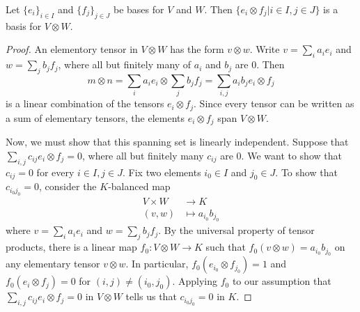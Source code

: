 \begin{prop}
Let $\{ e_i \}_{i \in I}$ and $\{ f_j \}_{j \in J}$ be bases for $V$ and $W$.  Then $\{ e_i \otimes f_j | i \in I, j \in J\}$  is a basis for $V \otimes W$.
\end{prop}
\begin{proof}
An elementory tensor in $V \otimes W$ has the form $v \otimes w$.  Write $v = \sum_i a_i e_i$ and $w = \sum_j b_j f_j$, where all but finitely many of $a_i$ and $b_j$ are 0.  Then 
\[ m \otimes n = \sum_i a_i e_i \otimes \sum_j b_j f_j  = \sum_{i,j} a_i b_j e_i \otimes f_j\]
is a linear combination of the tensors $e_i \otimes f_j$.  Since every tensor can be written as a sum of elementary tensors, the elements $e_i \otimes f_j$ span $V \otimes W$.

Now, we must show that this spanning set is linearly independent.  Suppose that $\sum_{i,j} c_{ij} e_i \otimes f_j = 0$, where all but finitely many $c_{ij}$ are 0.  We want to show that $c_{ij} = 0$ for every $i \in I, j \in J$. Fix two elements $ i_0 \in I$ and $j_0 \in J$.  To show that $c_{i_0 j_0} = 0$, consider the $K$-balanced map
\begin{align*}
V \times W &\to K \\
(v,w) &\mapsto a_{i_0} b_{j_0}
\end{align*}
 where $v = \sum_i a_i e_i$ and $w = \sum_j b_j f_j$. By the universal property of tensor products, there is a linear map $f_0 \colon V \otimes W \to K$ such that $f_0 (v \otimes w) = a_{i_0} b_{j_0}$ on any elementary tensor $v \otimes w$.  In particular, $f_0 (e_{i_0} \otimes f_{j_0}) = 1$ and  $f_0 (e_{i} \otimes f_{j}) = 0$ for $(i,j) \neq (i_0, j_0)$.  Applying $f_0$ to our assumption that $\sum_{i,j} c_{ij} e_i \otimes f_j = 0$ in $V \otimes W$ tells us that $c_{i_0 j_0} =0$ in $K$.  
\end{proof}

